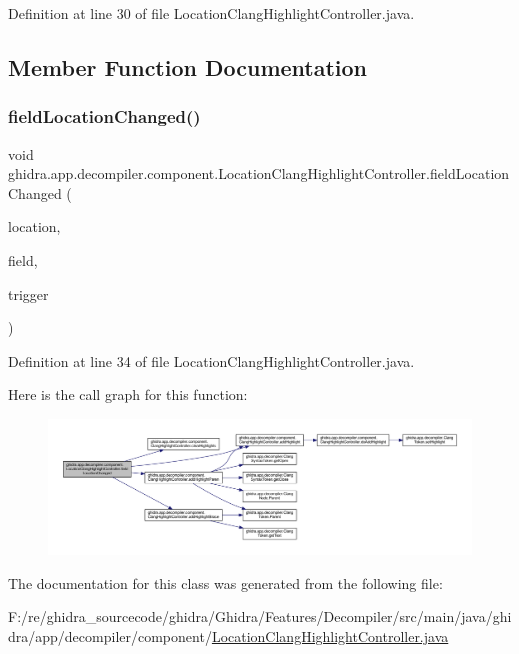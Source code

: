 Definition at line 30 of file Location\+Clang\+Highlight\+Controller.\+java.



\subsection{Member Function Documentation}
\mbox{\label{classghidra_1_1app_1_1decompiler_1_1component_1_1_location_clang_highlight_controller_a6be674bef388590defba326704f09365}} 
\subsubsection{\texorpdfstring{fieldLocationChanged()}{fieldLocationChanged()}}
{\footnotesize\ttfamily void ghidra.\+app.\+decompiler.\+component.\+Location\+Clang\+Highlight\+Controller.\+field\+Location\+Changed (\begin{DoxyParamCaption}\item[{Field\+Location}]{location,  }\item[{Field}]{field,  }\item[{Event\+Trigger}]{trigger }\end{DoxyParamCaption})\hspace{0.3cm}{\ttfamily [inline]}}



Definition at line 34 of file Location\+Clang\+Highlight\+Controller.\+java.

Here is the call graph for this function\+:
\nopagebreak
\begin{figure}[H]
\begin{center}
\leavevmode
\includegraphics[width=350pt]{classghidra_1_1app_1_1decompiler_1_1component_1_1_location_clang_highlight_controller_a6be674bef388590defba326704f09365_cgraph}
\end{center}
\end{figure}


The documentation for this class was generated from the following file\+:\begin{DoxyCompactItemize}
\item 
F\+:/re/ghidra\+\_\+sourcecode/ghidra/\+Ghidra/\+Features/\+Decompiler/src/main/java/ghidra/app/decompiler/component/\mbox{\hyperlink{_location_clang_highlight_controller_8java}{Location\+Clang\+Highlight\+Controller.\+java}}\end{DoxyCompactItemize}
